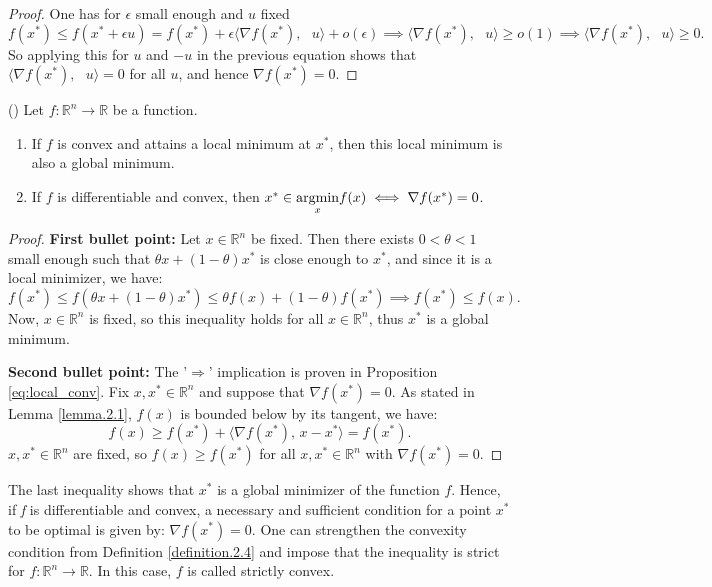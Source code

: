 \begin{proof}
One has for $\epsilon$ small enough and $u$ fixed
$$f(x^{*}) \leq f(x^{*} + \epsilon u) = f(x^{*}) + \epsilon \langle \nabla f(x^{*}),\text{ }u\rangle + o(\epsilon) \implies \langle \nabla f(x^{*}),\text{ }u\rangle \geq o(1) \implies \langle \nabla f(x^{*}),\text{ }u\rangle \geq 0.$$ So applying this for $u$ and $-u$ in the previous equation shows that $\langle \nabla f(x^{*}),\text{ }u\rangle = 0$ for all $u$, and hence $\nabla f(x^{*}) = 0.$
\end{proof}
\begin{proposition}\textnormal{(\cite[7]{coursenotesML})}\label{eq:argmin_conv}
Let $f:\mathbb{R}^{n}\longrightarrow\mathbb{R}$ be a function.
\begin{enumerate}
    \item If $f$ is convex and attains a local minimum at $x^{*}$, then this local minimum is also a global minimum.
    \item If $f$ is differentiable and convex, then $x^{*} \in \underset{x}{\textnormal{argmin}}f(x) \iff \nabla f(x^{*}) = 0$.
\end{enumerate}
\end{proposition}
\begin{proof}
\textbf{First bullet point:}
Let $x \in \mathbb{R}^n$ be fixed. Then there exists $0 < \theta < 1$ small enough such that $\theta x + (1-\theta)x^{*}$ is close enough to $x^{*}$, and since it is a local minimizer, we have:
\[
f(x^{*}) \leq f(\theta x + (1-\theta)x^{*}) \leq \theta f(x) + (1-\theta) f(x^{*}) \implies f(x^{*}) \leq f(x).
\]
Now, $x \in \mathbb{R}^n$ is fixed, so this inequality holds for all $x \in \mathbb{R}^n$, thus $x^{*}$ is a global minimum.

\textbf{Second bullet point:}
The '$\Rightarrow$' implication is proven in Proposition \ref{eq:local_conv}. Fix $x,x^{*}\in\mathbb{R}^{n}$ and suppose that $\nabla f(x^{*}) = 0$. As stated in Lemma \ref{lemma.2.1}, $f(x)$ is bounded below by its tangent, we have:
\[
f(x) \geq f(x^{*}) + \langle \nabla f(x^{*}),\, x - x^{*}\rangle = f(x^{*}).
\]
$x,x^{*}\in\mathbb{R}^{n}$ are fixed, so $f(x)\geq f(x^{*})$ for all $x,x^{*}\in\mathbb{R}^{n}$ with $\nabla f(x^{*})=0.$
\end{proof}
The last inequality shows that $x^{*}$ is a global minimizer of the function $f$. Hence, if \textit{f} is differentiable and convex, a necessary and sufficient condition for a point $x^{*}$ to be optimal is given by: $\nabla f(x^{*}) = 0.$ 
One can strengthen the convexity condition from Definition \ref{definition.2.4} and impose that the inequality is strict for $f:\mathbb{R}^{n}\longrightarrow\mathbb{R}.$ In this case, $f$ is called strictly convex. 
